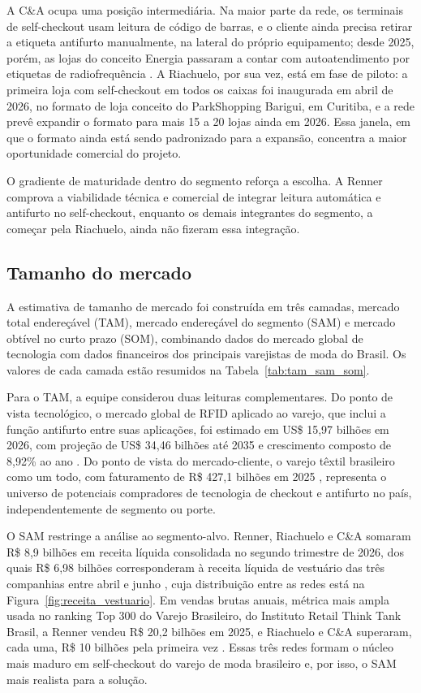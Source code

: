 A C\&A ocupa uma posição intermediária. Na maior parte da rede, os terminais de self-checkout usam leitura de código de barras, e o cliente ainda precisa retirar a etiqueta antifurto manualmente, na lateral do próprio equipamento; desde 2025, porém, as lojas do conceito Energia passaram a contar com autoatendimento por etiquetas de radiofrequência \cite{brazileconomy2025cea}. A Riachuelo, por sua vez, está em fase de piloto: a primeira loja com self-checkout em todos os caixas foi inaugurada em abril de 2026, no formato de loja conceito do ParkShopping Barigui, em Curitiba, e a rede prevê expandir o formato para mais 15 a 20 lojas ainda em 2026. Essa janela, em que o formato ainda está sendo padronizado para a expansão, concentra a maior oportunidade comercial do projeto.

O gradiente de maturidade dentro do segmento reforça a escolha. A Renner comprova a viabilidade técnica e comercial de integrar leitura automática e antifurto no self-checkout, enquanto os demais integrantes do segmento, a começar pela Riachuelo, ainda não fizeram essa integração.

\subsection{Tamanho do mercado}
\label{subsec:tamanho_mercado}

A estimativa de tamanho de mercado foi construída em três camadas, mercado total endereçável (TAM), mercado endereçável do segmento (SAM) e mercado obtível no curto prazo (SOM), combinando dados do mercado global de tecnologia com dados financeiros dos principais varejistas de moda do Brasil. Os valores de cada camada estão resumidos na Tabela~\ref{tab:tam_sam_som}.

Para o TAM, a equipe considerou duas leituras complementares. Do ponto de vista tecnológico, o mercado global de RFID aplicado ao varejo, que inclui a função antifurto entre suas aplicações, foi estimado em US\$ 15,97 bilhões em 2026, com projeção de US\$ 34,46 bilhões até 2035 e crescimento composto de 8,92\% ao ano \cite{businessresearch2026rfid}. Do ponto de vista do mercado-cliente, o varejo têxtil brasileiro como um todo, com faturamento de R\$ 427,1 bilhões em 2025 \cite{gbljeans2026maiores}, representa o universo de potenciais compradores de tecnologia de checkout e antifurto no país, independentemente de segmento ou porte.

O SAM restringe a análise ao segmento-alvo. Renner, Riachuelo e C\&A somaram R\$ 8,9 bilhões em receita líquida consolidada no segundo trimestre de 2026, dos quais R\$ 6,98 bilhões corresponderam à receita líquida de vestuário das três companhias entre abril e junho \cite{gbljeans2026trimestre}, cuja distribuição entre as redes está na Figura~\ref{fig:receita_vestuario}. Em vendas brutas anuais, métrica mais ampla usada no ranking Top 300 do Varejo Brasileiro, do Instituto Retail Think Tank Brasil, a Renner vendeu R\$ 20,2 bilhões em 2025, e Riachuelo e C\&A superaram, cada uma, R\$ 10 bilhões pela primeira vez \cite{gbljeans2026ranking}. Essas três redes formam o núcleo mais maduro em self-checkout do varejo de moda brasileiro e, por isso, o SAM mais realista para a solução.

